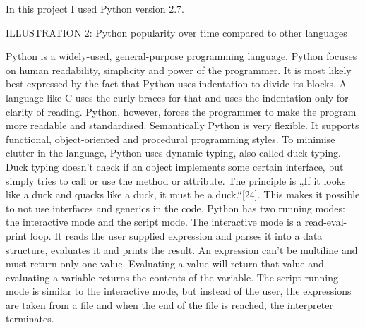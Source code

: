In this project I used Python version 2.7.

ILLUSTRATION 2: Python popularity over time compared to other languages

Python is a widely-used, general-purpose programming language. Python focuses on human readability, simplicity and power of the programmer. It is most likely best expressed by the fact that Python uses indentation to divide its blocks. A language like C uses the curly braces for that and uses the indentation only for clarity of reading. Python, however, forces the programmer to make the program more readable and standardised. Semantically Python is very flexible. It supports functional, object-oriented and procedural programming styles.
To minimise clutter in the language, Python uses dynamic typing, also called duck typing. Duck typing doesn't check if an object implements some certain interface, but simply tries to call or use the method or attribute. The principle is „If it looks like a duck and quacks like a duck, it must be a duck.“[24]. This makes it possible to not use interfaces and generics in the code.
Python has two running modes: the interactive mode and the script mode. The interactive mode is a read-eval-print loop. It reads the user supplied expression and parses it into a data structure, evaluates it and prints the result. An expression can't be multiline and must return only one value. Evaluating a value will return that value and evaluating a variable returns the contents of the variable. The script running mode is similar to the interactive mode, but instead of the user, the expressions are taken from a file and when the end of the file is reached, the interpreter terminates.

